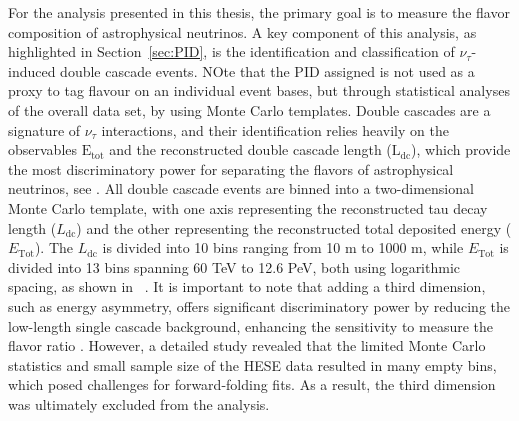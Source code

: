 For the analysis presented in this thesis, the primary goal is to measure the flavor composition of astrophysical neutrinos. A key component of this analysis, as highlighted in Section~\ref{sec:PID}, is the identification and classification of $\nu_\tau$-induced double cascade events. NOte that the PID assigned is not used as a proxy to tag flavour on an individual event bases, but through statistical analyses of the overall data set, by using Monte Carlo templates.    Double cascades are a signature of $\nu_\tau$ interactions, and their identification relies heavily on the observables $\mathrm{E}_\mathrm{tot}$ and the reconstructed double cascade length ($\mathrm{L}_{\text{dc}}$), which provide the most discriminatory power for separating the flavors of astrophysical neutrinos, see . All double cascade events are binned into a two-dimensional Monte Carlo template, with one axis representing the reconstructed tau decay length ($L_{\text{dc}}$) and the other representing the reconstructed total deposited energy ($E_{\text{Tot}}$). The $L_{\text{dc}}$ is divided into 10 bins ranging from 10 m to 1000 m, while $E_{\text{Tot}}$ is divided into 13 bins spanning 60 TeV to 12.6 PeV, both using logarithmic spacing, as shown in ~. It is important to note that adding a third dimension, such as energy asymmetry, offers significant discriminatory power by reducing the low-length single cascade background, enhancing the sensitivity to measure the flavor ratio . However, a detailed study revealed that the limited Monte Carlo statistics and small sample size of the HESE data resulted in many empty bins, which posed challenges for forward-folding fits. As a result, the third dimension was ultimately excluded from the analysis.


